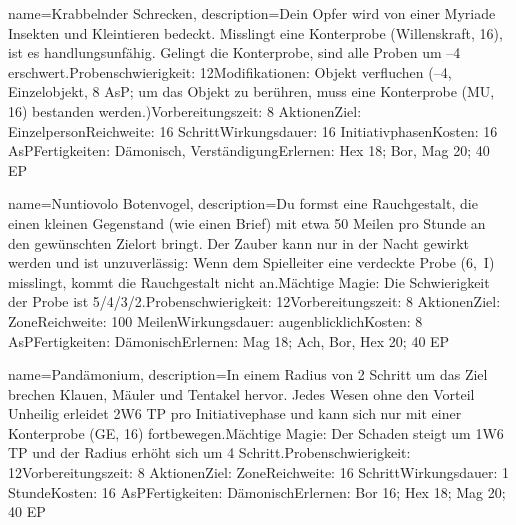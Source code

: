 {
    name={Krabbelnder Schrecken},
    description={Dein Opfer wird von einer Myriade Insekten und Kleintieren bedeckt. Misslingt eine Konterprobe (Willenskraft, 16), ist es handlungsunfähig. Gelingt die Konterprobe, sind alle Proben um –4 erschwert.\newline Probenschwierigkeit: 12\newline Modifikationen: Objekt verfluchen (–4, Einzelobjekt, 8 AsP; um das Objekt zu berühren, muss eine Konterprobe (MU, 16) bestanden werden.)\newline Vorbereitungszeit: 8 Aktionen\newline Ziel: Einzelperson\newline Reichweite: 16 Schritt\newline Wirkungsdauer: 16 Initiativphasen\newline Kosten: 16 AsP\newline Fertigkeiten: Dämonisch, Verständigung\newline Erlernen: Hex 18; Bor, Mag 20; 40 EP}
}


{
    name={Nuntiovolo Botenvogel},
    description={Du formst eine Rauchgestalt, die einen kleinen Gegenstand (wie einen Brief) mit etwa 50 Meilen pro Stunde an den gewünschten Zielort bringt. Der Zauber kann nur in der Nacht gewirkt werden und ist unzuverlässig: Wenn dem Spielleiter eine verdeckte Probe (6, I) misslingt, kommt die Rauchgestalt nicht an.\newline Mächtige Magie: Die Schwierigkeit der Probe ist 5/4/3/2.\newline Probenschwierigkeit: 12\newline Vorbereitungszeit: 8 Aktionen\newline Ziel: Zone\newline Reichweite: 100 Meilen\newline Wirkungsdauer: augenblicklich\newline Kosten: 8 AsP\newline Fertigkeiten: Dämonisch\newline Erlernen: Mag 18; Ach, Bor, Hex 20; 40 EP}
}


{
    name={Pandämonium},
    description={In einem Radius von 2 Schritt um das Ziel brechen Klauen, Mäuler und Tentakel hervor. Jedes Wesen ohne den Vorteil Unheilig erleidet 2W6 TP pro Initiativephase und kann sich nur mit einer Konterprobe (GE, 16) fortbewegen.\newline Mächtige Magie: Der Schaden steigt um 1W6 TP und der Radius erhöht sich um 4 Schritt.\newline Probenschwierigkeit: 12\newline Vorbereitungszeit: 8 Aktionen\newline Ziel: Zone\newline Reichweite: 16 Schritt\newline Wirkungsdauer: 1 Stunde\newline Kosten: 16 AsP\newline Fertigkeiten: Dämonisch\newline Erlernen: Bor 16; Hex 18; Mag 20; 40 EP}
}


